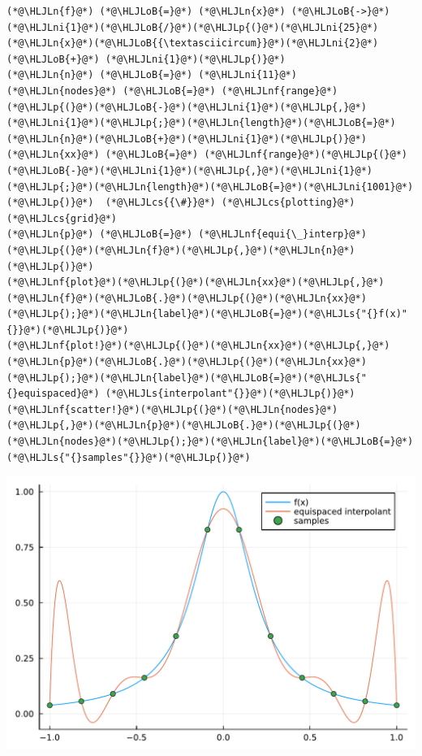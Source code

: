 \documentclass[12pt,a4paper]{article}
\newcommand{\HLJLn}[1]{#1}
\newcommand{\HLJLnf}[1]{\textcolor[RGB]{66,102,213}{#1}}
\newcommand{\HLJLs}[1]{\textcolor[RGB]{201,61,57}{#1}}
\newcommand{\HLJLni}[1]{\textcolor[RGB]{59,151,46}{#1}}
\newcommand{\HLJLoB}[1]{\textcolor[RGB]{102,102,102}{\textbf{#1}}}
\newcommand{\HLJLp}[1]{#1}
\newcommand{\HLJLcs}[1]{\textcolor[RGB]{153,153,119}{\textit{#1}}}
\begin{document}
\begin{lstlisting}
(*@\HLJLn{f}@*) (*@\HLJLoB{=}@*) (*@\HLJLn{x}@*) (*@\HLJLoB{->}@*) (*@\HLJLni{1}@*)(*@\HLJLoB{/}@*)(*@\HLJLp{(}@*)(*@\HLJLni{25}@*)(*@\HLJLn{x}@*)(*@\HLJLoB{{\textasciicircum}}@*)(*@\HLJLni{2}@*) (*@\HLJLoB{+}@*) (*@\HLJLni{1}@*)(*@\HLJLp{)}@*)
(*@\HLJLn{n}@*) (*@\HLJLoB{=}@*) (*@\HLJLni{11}@*)
(*@\HLJLn{nodes}@*) (*@\HLJLoB{=}@*) (*@\HLJLnf{range}@*)(*@\HLJLp{(}@*)(*@\HLJLoB{-}@*)(*@\HLJLni{1}@*)(*@\HLJLp{,}@*)(*@\HLJLni{1}@*)(*@\HLJLp{;}@*)(*@\HLJLn{length}@*)(*@\HLJLoB{=}@*)(*@\HLJLn{n}@*)(*@\HLJLoB{+}@*)(*@\HLJLni{1}@*)(*@\HLJLp{)}@*)  
(*@\HLJLn{xx}@*) (*@\HLJLoB{=}@*) (*@\HLJLnf{range}@*)(*@\HLJLp{(}@*)(*@\HLJLoB{-}@*)(*@\HLJLni{1}@*)(*@\HLJLp{,}@*)(*@\HLJLni{1}@*)(*@\HLJLp{;}@*)(*@\HLJLn{length}@*)(*@\HLJLoB{=}@*)(*@\HLJLni{1001}@*)(*@\HLJLp{)}@*)  (*@\HLJLcs{{\#}}@*) (*@\HLJLcs{plotting}@*) (*@\HLJLcs{grid}@*)
(*@\HLJLn{p}@*) (*@\HLJLoB{=}@*) (*@\HLJLnf{equi{\_}interp}@*)(*@\HLJLp{(}@*)(*@\HLJLn{f}@*)(*@\HLJLp{,}@*)(*@\HLJLn{n}@*)(*@\HLJLp{)}@*) 
(*@\HLJLnf{plot}@*)(*@\HLJLp{(}@*)(*@\HLJLn{xx}@*)(*@\HLJLp{,}@*)(*@\HLJLn{f}@*)(*@\HLJLoB{.}@*)(*@\HLJLp{(}@*)(*@\HLJLn{xx}@*)(*@\HLJLp{);}@*)(*@\HLJLn{label}@*)(*@\HLJLoB{=}@*)(*@\HLJLs{"{}f(x)"{}}@*)(*@\HLJLp{)}@*)
(*@\HLJLnf{plot!}@*)(*@\HLJLp{(}@*)(*@\HLJLn{xx}@*)(*@\HLJLp{,}@*)(*@\HLJLn{p}@*)(*@\HLJLoB{.}@*)(*@\HLJLp{(}@*)(*@\HLJLn{xx}@*)(*@\HLJLp{);}@*)(*@\HLJLn{label}@*)(*@\HLJLoB{=}@*)(*@\HLJLs{"{}equispaced}@*) (*@\HLJLs{interpolant"{}}@*)(*@\HLJLp{)}@*)
(*@\HLJLnf{scatter!}@*)(*@\HLJLp{(}@*)(*@\HLJLn{nodes}@*)(*@\HLJLp{,}@*)(*@\HLJLn{p}@*)(*@\HLJLoB{.}@*)(*@\HLJLp{(}@*)(*@\HLJLn{nodes}@*)(*@\HLJLp{);}@*)(*@\HLJLn{label}@*)(*@\HLJLoB{=}@*)(*@\HLJLs{"{}samples"{}}@*)(*@\HLJLp{)}@*)
\end{lstlisting}

\includegraphics[width=\linewidth]{jl_dOthw0/OP_methods_3_1.pdf}
\end{document}
